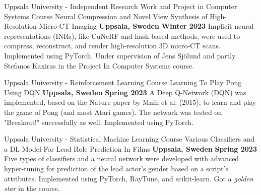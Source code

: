 

\begin{cventries}


        \cventry
        {Uppsala University - Independent Research Work and Project in Computer Systems Course} %
        {Neural Compression and Novel View Synthesis of High-Resolution Micro-CT Imaging} %
        {\textbf{Uppsala, Sweden}} %
        {\textbf{Winter 2023}} %
        {
            Implicit neural representations (INRs), like CuNeRF and hash-based methods, were used to compress, reconstruct, and render high-resolution 3D micro-CT scans. Implemented using PyTorch. Under supervision of Jens Sjölund and partly Stefanos Kaxiras in the Project In Computer Systems course.
        }
        
       \cventry
        {Uppsala University - Reinforcement Learning Course} %
        {Learning To Play Pong Using DQN} %
        {\textbf{Uppsala, Sweden}} %
        {\textbf{Spring 2023}} %
        {
            A Deep Q-Network (DQN) was implemented, based on the Nature paper by Mnih et al. (2015), to learn and play the game of Pong (and most Atari games). The network was tested on "Breakout!" successfully as well. Implemented using PyTorch.
        }


       \cventry
        {Uppsala University - Statistical Machine Learning Course} %
        {Various Classifiers and a DL Model For Lead Role Prediction In Films} %
        {\textbf{Uppsala, Sweden}} %
        {\textbf{Spring 2023}} %
        {
            Five types of classifiers and a neural network were developed with advanced hyper-tuning for prediction of the lead actor's gender based on a script's attributes. Implemented using PyTorch, RayTune, and scikit-learn. Got a \emph{golden star} in the course.
        }


\end{cventries}
